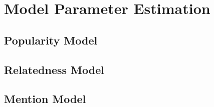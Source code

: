 \section{Model Parameter Estimation} \label{search_entity:estimation}
\subsection{Popularity Model} 

\subsection{Relatedness Model}

\subsection{Mention Model}






